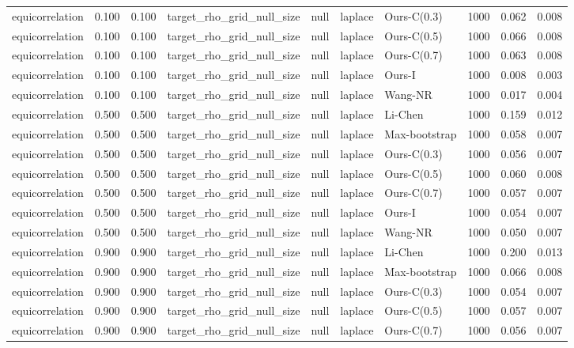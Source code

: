 \begin{tabular}{lrrllllrrr}
equicorrelation & 0.100 & 0.100 & target\_rho\_grid\_null\_size & null & laplace & Ours-C(0.3) & 1000 & 0.062 & 0.008 \\
equicorrelation & 0.100 & 0.100 & target\_rho\_grid\_null\_size & null & laplace & Ours-C(0.5) & 1000 & 0.066 & 0.008 \\
equicorrelation & 0.100 & 0.100 & target\_rho\_grid\_null\_size & null & laplace & Ours-C(0.7) & 1000 & 0.063 & 0.008 \\
equicorrelation & 0.100 & 0.100 & target\_rho\_grid\_null\_size & null & laplace & Ours-I & 1000 & 0.008 & 0.003 \\
equicorrelation & 0.100 & 0.100 & target\_rho\_grid\_null\_size & null & laplace & Wang-NR & 1000 & 0.017 & 0.004 \\
equicorrelation & 0.500 & 0.500 & target\_rho\_grid\_null\_size & null & laplace & Li-Chen & 1000 & 0.159 & 0.012 \\
equicorrelation & 0.500 & 0.500 & target\_rho\_grid\_null\_size & null & laplace & Max-bootstrap & 1000 & 0.058 & 0.007 \\
equicorrelation & 0.500 & 0.500 & target\_rho\_grid\_null\_size & null & laplace & Ours-C(0.3) & 1000 & 0.056 & 0.007 \\
equicorrelation & 0.500 & 0.500 & target\_rho\_grid\_null\_size & null & laplace & Ours-C(0.5) & 1000 & 0.060 & 0.008 \\
equicorrelation & 0.500 & 0.500 & target\_rho\_grid\_null\_size & null & laplace & Ours-C(0.7) & 1000 & 0.057 & 0.007 \\
equicorrelation & 0.500 & 0.500 & target\_rho\_grid\_null\_size & null & laplace & Ours-I & 1000 & 0.054 & 0.007 \\
equicorrelation & 0.500 & 0.500 & target\_rho\_grid\_null\_size & null & laplace & Wang-NR & 1000 & 0.050 & 0.007 \\
equicorrelation & 0.900 & 0.900 & target\_rho\_grid\_null\_size & null & laplace & Li-Chen & 1000 & 0.200 & 0.013 \\
equicorrelation & 0.900 & 0.900 & target\_rho\_grid\_null\_size & null & laplace & Max-bootstrap & 1000 & 0.066 & 0.008 \\
equicorrelation & 0.900 & 0.900 & target\_rho\_grid\_null\_size & null & laplace & Ours-C(0.3) & 1000 & 0.054 & 0.007 \\
equicorrelation & 0.900 & 0.900 & target\_rho\_grid\_null\_size & null & laplace & Ours-C(0.5) & 1000 & 0.057 & 0.007 \\
equicorrelation & 0.900 & 0.900 & target\_rho\_grid\_null\_size & null & laplace & Ours-C(0.7) & 1000 & 0.056 & 0.007 \\

\end{tabular}
